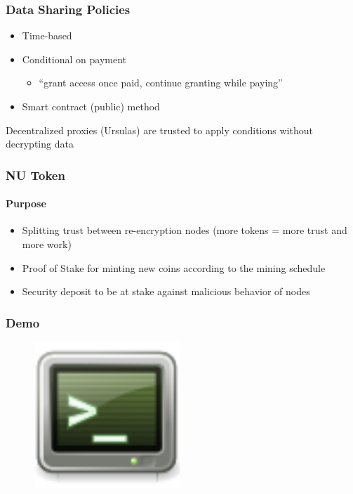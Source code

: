 \documentclass[xetex,mathsans,sans,aspectratio=169]{beamer}
\begin{document}
   \begin{frame}
        \frametitle{Data Sharing Policies}
        \begin{itemize}
            \item Time-based
            \item Conditional on payment 
            \begin{itemize}
              \item ``grant access once paid, continue granting while paying''
            \end{itemize}
            \item Smart contract (public) method
        \end{itemize}
        Decentralized proxies (Ursulas) are trusted to apply conditions without decrypting data
    \end{frame}

    \begin{frame}
        \frametitle{NU Token}
        \framesubtitle{Purpose}
        \begin{itemize}
            \item Splitting trust between re-encryption nodes (more tokens = more trust and more work)
            \item Proof of Stake for minting new coins according to the mining schedule
            \item Security deposit to be at stake against malicious behavior of nodes
        \end{itemize}
    \end{frame}

    \begin{frame}
        \frametitle{Demo}
        \begin{figure}
            \centering
            \includegraphics[height=5.5cm]{pdf/terminal.pdf}
        \end{figure}
    \end{frame}
\end{document}

